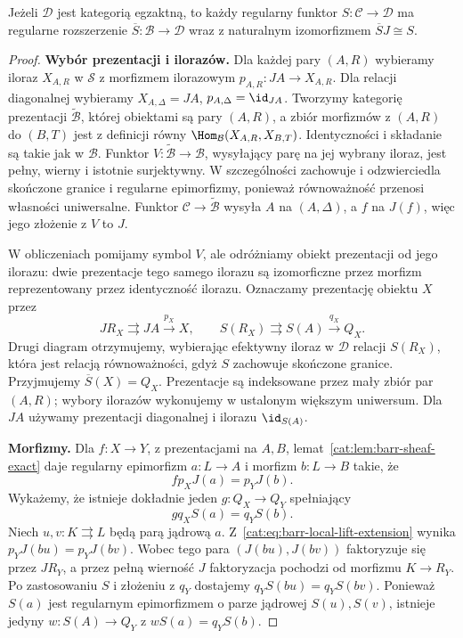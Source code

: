 \begin{stwierdzenie}\label{cat:prop:barr-completion-extension}
Jeżeli $\mathcal D$ jest kategorią egzaktną, to każdy regularny funktor $S:\mathcal C\to\mathcal D$ ma regularne rozszerzenie $\overline S:\mathcal B\to\mathcal D$ wraz z naturalnym izomorfizmem $\overline S J\cong S$.
\end{stwierdzenie}
\begin{proof}
\textbf{Wybór prezentacji i ilorazów.}
Dla każdej pary $(A,R)$ wybieramy iloraz $X_{A,R}$ w $\mathcal S$ z morfizmem ilorazowym $p_{A,R}:JA\to X_{A,R}$. Dla relacji diagonalnej wybieramy $X_{A,\Delta}=JA$, $p_{A,\Delta}=\id_{JA}$. Tworzymy kategorię prezentacji $\widetilde{\mathcal B}$, której obiektami są pary $(A,R)$, a zbiór morfizmów z $(A,R)$ do $(B,T)$ jest z definicji równy $\Hom_{\mathcal B}(X_{A,R},X_{B,T})$. Identyczności i składanie są takie jak w $\mathcal B$. Funktor $V:\widetilde{\mathcal B}\to\mathcal B$, wysyłający parę na jej wybrany iloraz, jest pełny, wierny i istotnie surjektywny. W szczególności zachowuje i odzwierciedla skończone granice i regularne epimorfizmy, ponieważ równoważność przenosi własności uniwersalne. Funktor $\mathcal C\to\widetilde{\mathcal B}$ wysyła $A$ na $(A,\Delta)$, a $f$ na $J(f)$, więc jego złożenie z $V$ to $J$.

W obliczeniach pomijamy symbol $V$, ale odróżniamy obiekt prezentacji od jego ilorazu: dwie prezentacje tego samego ilorazu są izomorficzne przez morfizm reprezentowany przez identyczność ilorazu. Oznaczamy prezentację obiektu $X$ przez
\[
 JR_X\rightrightarrows JA\xrightarrow{p_X}X,
 \qquad
 S(R_X)\rightrightarrows S(A)\xrightarrow{q_X}Q_X.
\]
Drugi diagram otrzymujemy, wybierając efektywny iloraz w $\mathcal D$ relacji $S(R_X)$, która jest relacją równoważności, gdyż $S$ zachowuje skończone granice. Przyjmujemy $\overline S(X)=Q_X$. Prezentacje są indeksowane przez mały zbiór par $(A,R)$; wybory ilorazów wykonujemy w ustalonym większym uniwersum. Dla $JA$ używamy prezentacji diagonalnej i ilorazu $\id_{S(A)}$.

\textbf{Morfizmy.}
Dla $f:X\to Y$, z prezentacjami na $A,B$, lemat~\ref{cat:lem:barr-sheaf-exact} daje regularny epimorfizm $a:L\to A$ i morfizm $b:L\to B$ takie, że
\begin{equation}\label{cat:eq:barr-local-lift-extension}
 f p_X J(a)=p_Y J(b).
\end{equation}
Wykażemy, że istnieje dokładnie jeden $g:Q_X\to Q_Y$ spełniający
\begin{equation}\label{cat:eq:barr-descended-map}
 gq_X S(a)=q_Y S(b).
\end{equation}
Niech $u,v:K\rightrightarrows L$ będą parą jądrową $a$. Z~\eqref{cat:eq:barr-local-lift-extension} wynika $p_Y J(bu)=p_Y J(bv)$. Wobec tego para $(J(bu),J(bv))$ faktoryzuje się przez $JR_Y$, a przez pełną wierność $J$ faktoryzacja pochodzi od morfizmu $K\to R_Y$. Po zastosowaniu $S$ i złożeniu z $q_Y$ dostajemy $q_YS(bu)=q_YS(bv)$. Ponieważ $S(a)$ jest regularnym epimorfizmem o parze jądrowej $S(u),S(v)$, istnieje jedyny $w:S(A)\to Q_Y$ z $wS(a)=q_YS(b)$.


\end{proof}
